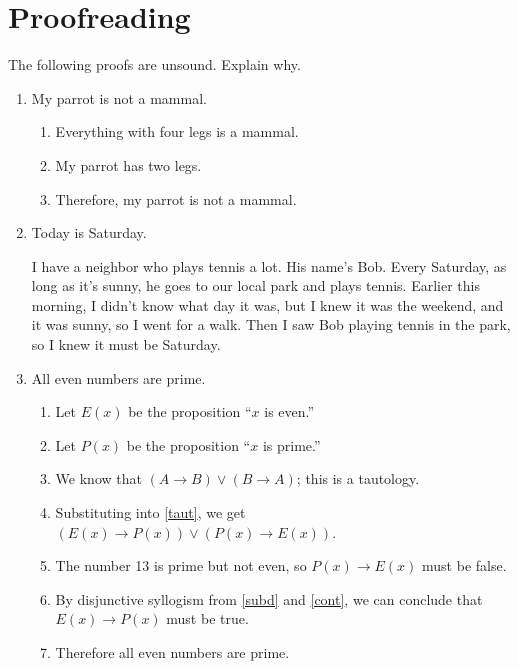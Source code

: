 \documentclass{article}
\begin{document}
\section{Proofreading}

The following proofs are unsound.
Explain why.

\begin{enumerate}[label=\textbf{\alph*.}]
    \item My parrot is not a mammal.
    \begin{enumerate}[label={(\arabic*})]
        \setlength{\itemsep}{0pt}
        \item Everything with four legs is a mammal.
        \item My parrot has two legs.
        \item Therefore, my parrot is not a mammal.
    \end{enumerate}

    \item Today is Saturday.

    I have a neighbor who plays tennis a lot.
    His name's Bob.
    Every Saturday, as long as it's sunny, he goes to our local park and plays tennis.
    Earlier this morning, I didn't know what day it was, but I knew it was the weekend, and it was sunny, so I went for a walk.
    Then I saw Bob playing tennis in the park, so I knew it must be Saturday.

    \item All even numbers are prime.
    \begin{enumerate}[label={(\arabic*})]
        \setlength{\itemsep}{0pt}
        \item Let $E(x)$ be the proposition ``$x$ is even.''
        \item Let $P(x)$ be the proposition ``$x$ is prime.''
        \item \label{taut} We know that $(A \rightarrow B) \vee (B \rightarrow A)$; this is a tautology.
        \item \label{subd} Substituting into \ref{taut}, we get $(E(x) \rightarrow P(x)) \vee (P(x) \rightarrow E(x))$.
        \item \label{cont} The number 13 is prime but not even, so $P(x) \rightarrow E(x)$ must be false.
        \item By disjunctive syllogism from \ref{subd} and \ref{cont}, we can conclude that $E(x) \rightarrow P(x)$ must be true.
        \item Therefore all even numbers are prime.
    \end{enumerate}
\end{enumerate}
\end{document}
